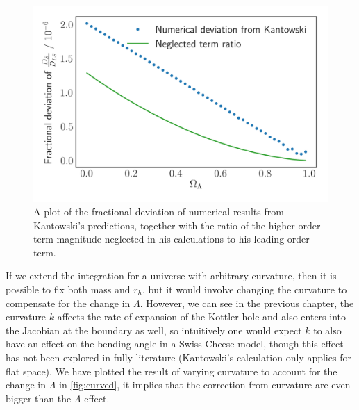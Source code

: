 


\begin{figure}
  \centering
  \includegraphics[height=0.5\linewidth]{images/flat-neglected_const_rh.png}
  \caption{A plot of the fractional deviation of numerical results from Kantowski's predictions, together with the ratio of the higher order term magnitude neglected in his calculations to his leading order term. }
  \label{fig:flat-const-rh-neglected}
\end{figure}

If we extend the integration for a universe with arbitrary curvature, then it is possible to fix both mass and $r_h$, but it would involve changing the curvature to compensate for the change in $\Lambda$. However, we can see in the previous chapter, the curvature $k$ affects the rate of expansion of the Kottler hole and also enters into the Jacobian at the boundary as well, so intuitively one would expect $k$ to also have an effect on the bending angle in a Swiss-Cheese model, though this effect has not been explored in fully literature (Kantowski's calculation \citet{kantowski2010gravitational} only applies for flat space). We have plotted the result of varying curvature to account for the change in $\Lambda$ in \autoref{fig:curved}, it implies that the correction from curvature are even bigger than the $\Lambda$-effect. 

